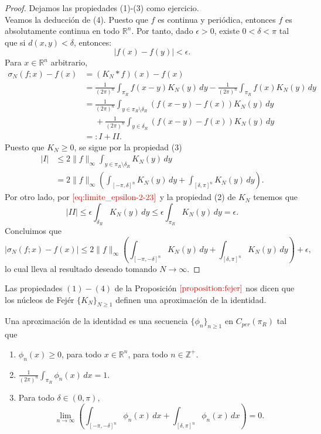     \begin{proof}
      Dejamos las propiedades (1)-(3) como ejercicio.\\
      Veamos la deducción de (4). Puesto que $f$ es continua y periódica, entonces $f$ es absolutamente continua en todo $\mathbb{R}^{n}$. Por tanto, dado $\epsilon > 0$, existe $0 < \delta < \pi$ tal que si $d(x,y)<\delta$, entonces:
      \begin{equation}
        |f(x) - f(y)| < \epsilon.\label{eq:limite_epsilon-2-23}
      \end{equation}
      Para $x \in \mathbb{R}^{n}$ arbitrario,
      \begin{align*}
        \sigma_N(f;x) - f(x) &= (K_N * f)(x) - f(x)\\
        &= \frac{1}{(2\pi)^n} \int_{\pi_R} f(x-y) K_N(y) \, dy - \frac{1}{(2\pi)^{n}} \int_{\pi_R} f(x) K_N(y) \, dy\\
        &= \frac{1}{(2\pi)^{n}} \int_{y\in \pi_R\setminus \delta_R} (f(x - y) - f(x)) K_N(y) \, dy\\
        &\phantom{=}+ \frac{1}{(2\pi)^{n}} \int_{y\in \delta_R} (f(x - y) - f(x)) K_N(y) \, dy\\
        &=: I + II.
      \end{align*}
      Puesto que $K_N \geq 0$, se sigue por la propiedad (3)
      \begin{align*}
        |I| &\leq 2 \|f\|_\infty \int_{y\in\pi_R\setminus \delta_R} K_N(y) \, dy\\
        &= 2 \|f\|_\infty \left( \int_{[-\pi,\delta]^{n}} K_N(y) \, dy + \int_{[\delta,\pi]^{n}} K_N(y) \, dy \right).
      \end{align*}
      Por otro lado, por $\textcolor{red}{\ref{eq:limite_epsilon-2-23}}$ y la propiedad (2) de $K_N$ tenemos que
      $$|II| \leq \epsilon \int_{\delta_R} K_N(y) \, dy \leq \epsilon \int_{\pi_R} K_N(y) \, dy = \epsilon.$$
      Concluimos que
      $$|\sigma_N(f;x) - f(x)| \leq 2 \|f\|_\infty \left( \int_{[-\pi,-\delta]^{n}} K_N(y) \, dy + \int_{[\delta,\pi]^{n}} K_N(y) \, dy \right) + \epsilon,$$
      lo cual lleva al resultado deseado tomando $N \to \infty$.   
    \end{proof}
    Las propiedades $(1)-(4)$ de la Proposición $\textcolor{red}{\ref{proposition:fejer}}$ nos dicen que los núcleos de Fejér $\{K_N\}_{N \geq 1}$ definen una aproximación de la identidad.
    \begin{definition}
      Una aproximación de la identidad es una secuencia $\{\phi_n\}_{n \geq 1}$ en $C_{per}(\pi_R)$ tal que
      \begin{enumerate}
        \item $\phi_n(x) \geq 0$, para todo $x \in \mathbb{R}^{n}$, para todo $n \in \mathbb{Z}^+$.
        \item $\frac{1}{(2\pi)^{n}} \int_{\pi_R} \phi_n(x) \, dx = 1$.
        \item Para todo $\delta \in (0, \pi)$,
          $$\lim_{n \to \infty} \left( \int_{[-\pi,-\delta]^n} \phi_n(x) \, dx + \int_{[\delta,\pi]^n} \phi_n(x) \, dx \right) = 0.$$
      \end{enumerate}
    \end{definition}
